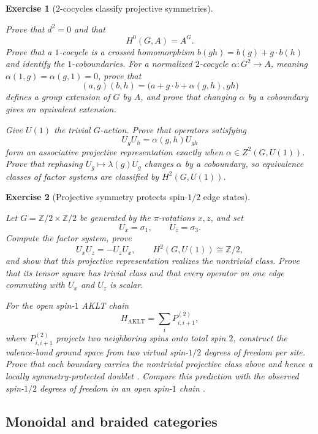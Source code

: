 \documentclass{article}
\newtheorem{exercise}{Exercise}
\begin{document}
\begin{exercise}[$2$-cocycles classify projective symmetries]
\label{ex:group-cohomology}\leavevmode\par
\textit{Prove that $d^2=0$ and that}
\[
H^0(G,A)=A^G.
\]
\textit{Prove that a $1$-cocycle is a crossed homomorphism
$b(gh)=b(g)+g\cdot b(h)$ and identify the $1$-coboundaries. For a normalized
$2$-cocycle $\alpha:G^2\to A$, meaning
$\alpha(1,g)=\alpha(g,1)=0$, prove that}
\[
(a,g)(b,h)
=\bigl(a+g\cdot b+\alpha(g,h),gh\bigr)
\]
\textit{defines a group extension of $G$ by $A$, and prove that changing
$\alpha$ by a coboundary gives an equivalent extension.}

\textit{Give $U(1)$ the trivial $G$-action. Prove that operators satisfying}
\[
U_gU_h=\alpha(g,h)U_{gh}
\]
\textit{form an associative projective representation exactly when
$\alpha\in Z^2(G,U(1))$. Prove that rephasing
$U_g\mapsto\lambda(g)U_g$ changes $\alpha$ by a coboundary, so equivalence
classes of factor systems are classified by $H^2(G,U(1))$.}
\end{exercise}

\begin{exercise}[Projective symmetry protects spin-$1/2$ edge states]
\label{ex:haldane-edge}\leavevmode\par
\textit{Let $G=\mathbb Z/2\times\mathbb Z/2$ be generated by the
$\pi$-rotations $x,z$, and set}
\[
U_x=\sigma_1,\qquad U_z=\sigma_3.
\]
\textit{Compute the factor system, prove}
\[
U_xU_z=-U_zU_x,
\qquad
H^2(G,U(1))\cong\mathbb Z/2,
\]
\textit{and show that this projective representation realizes the
nontrivial class. Prove that its tensor square has trivial class and that
every operator on one edge commuting with $U_x$ and $U_z$ is scalar.}

\textit{For the open spin-$1$ AKLT chain}
\[
H_{\mathrm{AKLT}}
=\sum_iP^{(2)}_{i,i+1},
\]
\textit{where $P^{(2)}_{i,i+1}$ projects two neighboring spins onto total
spin $2$, construct the valence-bond ground space from two virtual
spin-$1/2$ degrees of freedom per site. Prove that each boundary carries the
nontrivial projective class above and hence a locally symmetry-protected
doublet} \cite{aklt}. \textit{Compare this prediction with the observed
spin-$1/2$ degrees of freedom in an open spin-$1$ chain}
\cite{hagiwara-edge}.\par
\end{exercise}

\subsection{Monoidal and braided categories}
\end{document}
